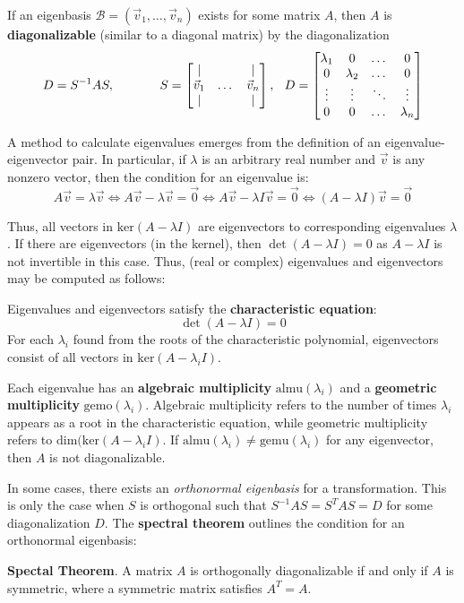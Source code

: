\begin{shaded}
If an eigenbasis $\mathcal{B}=(\vec{v}_1,\dots,\vec{v}_n)$ exists for some matrix $A$, then $A$ is \textbf{diagonalizable} (similar to a diagonal matrix) by the diagonalization \[D = S^{-1}AS,\hspace{0.5in}S = \begin{bmatrix}
    | & & |\\
    \vec{v}_1 & \dots & \vec{v}_n\\
    | & & |
\end{bmatrix},\hspace{0.1in}D = \begin{bmatrix}
    \lambda_1 & 0 & \dots & 0\\
    0 & \lambda_2 & \dots & 0\\
    \vdots & \vdots & \ddots & \vdots\\
    0 & 0 & \dots & \lambda_n
\end{bmatrix}\]
\end{shaded}

\newpage

A method to calculate eigenvalues emerges from the definition of an eigenvalue-eigenvector pair. In particular, if $\lambda$ is an arbitrary real number and $\vec{v}$ is any nonzero vector, then the condition for an eigenvalue is: \[A\vec{v}=\lambda\vec{v} \iff A\vec{v}-\lambda\vec{v} = \vec{0} \iff A\vec{v}-\lambda I\vec{v} = \vec{0} \iff (A-\lambda I)\vec{v} = \vec{0}\]

Thus, all vectors in $\text{ker}(A-\lambda I)$ are eigenvectors to corresponding eigenvalues $\lambda$. If there are eigenvectors (in the kernel), then $\det(A-\lambda I) = 0$ as $A-\lambda I$ is not invertible in this case. Thus, (real or complex) eigenvalues and eigenvectors may be computed as follows:

\begin{shaded}
    Eigenvalues and eigenvectors satisfy the \textbf{characteristic equation}: \[\det (A-\lambda I) = 0\] For each $\lambda_i$ found from the roots of the characteristic polynomial, eigenvectors consist of all vectors in $\text{ker}(A-\lambda_i I)$.
\end{shaded}

Each eigenvalue has an \textbf{algebraic multiplicity} $\text{almu}(\lambda_i)$ and a \textbf{geometric multiplicity} $\text{gemo}(\lambda_i)$. Algebraic multiplicity refers to the number of times $\lambda_i$ appears as a root in the characteristic equation, while geometric multiplicity refers to $\text{dim}(\text{ker}(A-\lambda_iI)$. If $\text{almu}(\lambda_i)\neq\text{gemu}(\lambda_i)$ for any eigenvector, then $A$ is not diagonalizable.

In some cases, there exists an \textit{orthonormal eigenbasis} for a transformation. This is only the case when $S$ is orthogonal such that $S^{-1}AS = S^T A S = D$ for some diagonalization $D$. The \textbf{spectral theorem} outlines the condition for an orthonormal eigenbasis:

\begin{shaded}
    \textbf{Spectal Theorem}. A matrix $A$ is orthogonally diagonalizable if and only if $A$ is symmetric, where a symmetric matrix satisfies $A^T=A$.
\end{shaded}
